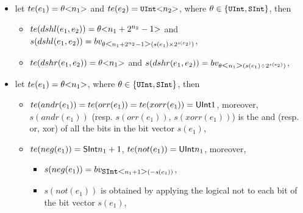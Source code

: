 {\begin{itemize}
\begin{itemize}
\begin{itemize}
%
\item if  $\theta=\mbox{\prettyll{SInt}}$, $s(e_1) \ge 0$, and $s(e_2) < 0$, then \\ $s(cat(e_1, e_2))$ is $bv_{\mbox{\prettyll{UInt}}\bwidth{n_1+n_2}(s(e_1) \times 2^{n_2} + 2^{n_2} + s(e_2))}$,
%
\item if  $\theta=\mbox{\prettyll{SInt}}$ and $s(e_1) < 0, s(e_2) \ge 0$, then \\  $s(cat(e_1, e_2))$ is $bv_{\mbox{\prettyll{UInt}}\bwidth{n_1+n_2}((2^{n_1}+s(e_1)) \times 2^{n_2} + s(e_2))}$,
%
\item if  $\theta=\mbox{\prettyll{SInt}}$ and $s(e_1) < 0, s(e_2) < 0$ then \\  $s(cat(e_1, e_2))$ is $bv_{\mbox{\prettyll{UInt}}\bwidth{n_1+n_2}((2^{n_1}-s(e_1)) \times 2^{n_2} + 2^{n_2}-s(e_2))}$,
\end{itemize}
\end{itemize}
%
\item let $te(e_1) = \theta \mbox{<} n_1 \mbox{>}$ and $te(e_2) = \mbox{\prettyll{UInt}} \bwidth{n_2}$, where $\theta \in \{\mbox{\prettyll{UInt}}, \mbox{\prettyll{SInt}}\}$, then
\begin{itemize}
\item $te(dshl(e_1, e_2)) = \theta \mbox{<} n_1+2^{n_2}-1 \mbox{>}$ and $s(dshl(e_1, e_2)) = bv_{\theta \mbox{<} n_1+2^{n_2}-1 \mbox{>}(s(e_1) \times 2^{s(e_2)})}$,
%
\item $te(dshr(e_1, e_2)) = \theta \mbox{<} n_1 \mbox{>}$ and $s(dshr(e_1, e_2)) = bv_{\theta \mbox{<} n_1 \mbox{>}(s(e_1) \div 2^{s(e_2)})}$,
%
\end{itemize}
%
\item let $te(e_1) = \theta \mbox{<} n_1 \mbox{>}$, where $\theta \in \{\mbox{\prettyll{UInt}}, \mbox{\prettyll{SInt}}\}$, then
\begin{itemize}
\item $te(andr(e_1)) = te(orr(e_1)) =  te(xorr(e_1)) = {\sf UInt}{1}$, moreover, $s(andr(e_1))$ (resp. $s(orr(e_1))$, $s(xorr(e_1))$) is the and (resp. or, xor) of all the bits in the bit vector $s(e_1)$,
%
\item $te(neg(e_1)) = {\sf SInt}{n_1 +1}$, $te(not(e_1)) =  {\sf UInt}{n_1}$, moreover,
\begin{itemize}
\item $s(neg(e_1)) = bv_{\mbox{\prettyll{SInt}}\bwidth{n_1+1}(-s(e_1))}$,
%
\item $s(not(e_1))$ is obtained by applying the logical not to each bit of the bit vector $s(e_1)$,
\end{itemize}

\end{itemize}
\end{itemize}}
